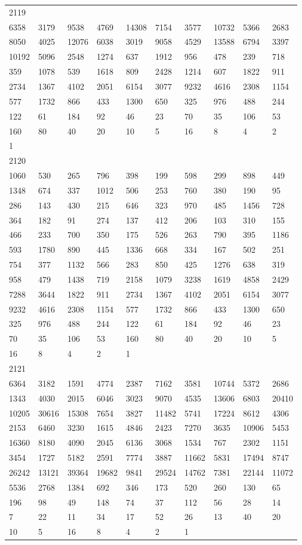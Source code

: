 \begin{longtable}{*{10}{l}}
2119&&&&&&&&&\\
6358& 3179& 9538& 4769& 14308& 7154& 3577& 10732& 5366& 2683\\
8050& 4025& 12076& 6038& 3019& 9058& 4529& 13588& 6794& 3397\\
10192& 5096& 2548& 1274& 637& 1912& 956& 478& 239& 718\\
359& 1078& 539& 1618& 809& 2428& 1214& 607& 1822& 911\\
2734& 1367& 4102& 2051& 6154& 3077& 9232& 4616& 2308& 1154\\
577& 1732& 866& 433& 1300& 650& 325& 976& 488& 244\\
122& 61& 184& 92& 46& 23& 70& 35& 106& 53\\
160& 80& 40& 20& 10& 5& 16& 8& 4& 2\\
1& \\

2120&&&&&&&&&\\
1060& 530& 265& 796& 398& 199& 598& 299& 898& 449\\
1348& 674& 337& 1012& 506& 253& 760& 380& 190& 95\\
286& 143& 430& 215& 646& 323& 970& 485& 1456& 728\\
364& 182& 91& 274& 137& 412& 206& 103& 310& 155\\
466& 233& 700& 350& 175& 526& 263& 790& 395& 1186\\
593& 1780& 890& 445& 1336& 668& 334& 167& 502& 251\\
754& 377& 1132& 566& 283& 850& 425& 1276& 638& 319\\
958& 479& 1438& 719& 2158& 1079& 3238& 1619& 4858& 2429\\
7288& 3644& 1822& 911& 2734& 1367& 4102& 2051& 6154& 3077\\
9232& 4616& 2308& 1154& 577& 1732& 866& 433& 1300& 650\\
325& 976& 488& 244& 122& 61& 184& 92& 46& 23\\
70& 35& 106& 53& 160& 80& 40& 20& 10& 5\\
16& 8& 4& 2& 1& \\

2121&&&&&&&&&\\
6364& 3182& 1591& 4774& 2387& 7162& 3581& 10744& 5372& 2686\\
1343& 4030& 2015& 6046& 3023& 9070& 4535& 13606& 6803& 20410\\
10205& 30616& 15308& 7654& 3827& 11482& 5741& 17224& 8612& 4306\\
2153& 6460& 3230& 1615& 4846& 2423& 7270& 3635& 10906& 5453\\
16360& 8180& 4090& 2045& 6136& 3068& 1534& 767& 2302& 1151\\
3454& 1727& 5182& 2591& 7774& 3887& 11662& 5831& 17494& 8747\\
26242& 13121& 39364& 19682& 9841& 29524& 14762& 7381& 22144& 11072\\
5536& 2768& 1384& 692& 346& 173& 520& 260& 130& 65\\
196& 98& 49& 148& 74& 37& 112& 56& 28& 14\\
7& 22& 11& 34& 17& 52& 26& 13& 40& 20\\
10& 5& 16& 8& 4& 2& 1& \\


\end{longtable}
